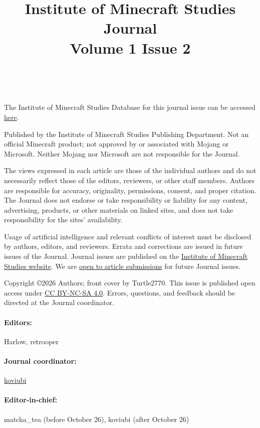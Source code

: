 \documentclass[a4paper,11pt,oneside]{book} %
\title{Institute of Minecraft Studies Journal\\Volume 1 Issue 2}
\newcommand\link[2]{\textcolor{blue}{\href{#1}{#2}}} %
\begin{document}
\frontmatter

\tableofcontents

\

The Institute of Minecraft Studies Database for this journal issue can be accessed \link{https://github.com/imsresearch/ims-website/tree/main/public/database/published/journal/2}{here}.

Published by the Institute of Minecraft Studies Publishing Department. Not an official Minecraft product; not approved by or associated with Mojang or Microsoft. Neither Mojang nor Microsoft are not responsible for the Journal.

The views expressed in each article are those of the individual authors and do not necessarily reflect those of the editors, reviewers, or other staff members. Authors are responsible for accuracy, originality, permissions, consent, and proper citation. The Journal does not endorse or take responsibility or liability for any content, advertising, products, or other materials on linked sites, and does not take responsibility for the sites' availability.

Usage of artificial intelligence and relevant conflicts of interest must be disclosed by authors, editors, and reviewers. Errata and corrections are issued in future issues of the Journal. Journal issues are published on the \link{https://imsresearch.pages.dev/pubdep}{Institute of Minecraft Studies website}. We are \link{https://imsresearch.pages.dev/publish-with-us}{open to article submissions} for future Journal issues.

Copyright \copyright 2026 Authors; front cover by Turtle2770. This issue is published open access under \link{https://creativecommons.org/licenses/by-nc-sa/4.0/legalcode.en}{CC BY-NC-SA 4.0}. Errors, questions, and feedback should be directed at the Journal coordinator.

\paragraph{Editors:} Harlow, retrooper
\paragraph{Journal coordinator:} \link{mailto:koviubi56@duck.com}{koviubi}
\paragraph{Editor-in-chief:} matcha\_tea (before October 26), koviubi (after October 26)

\mainmatter





\end{document}

